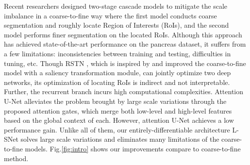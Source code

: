 \documentclass{article}
\begin{document}
Recent researchers designed two-stage cascade models \cite{zhou2017fixed,3dc2f} to mitigate the scale imbalance in a coarse-to-fine way where the first model conducts coarse segmentation and roughly locate Region of Interests (RoIs), and the second model performs finer segmentation on the located RoIs. Although this approach has achieved state-of-the-art performance on the pancreas dataset, it suffers from a few limitations: inconsistencies between training and testing, difficulties in tuning, etc. 
Though RSTN \cite{RSTN}, which is inspired by and improved the coarse-to-fine model with a saliency transformation module, can jointly optimize two deep networks, its optimization of locating RoIs is indirect and not interpretable. Further, the recurrent branch incurs high computational complexities. 
Attention U-Net \cite{attentionunet} alleviates the problem brought by large scale variations through the proposed attention gates, which merge both low-level and high-level features based on the global context of each. However, attention U-Net achieves a low performance gain. Unlike all of them, our entirely-differentiable architecture L-SNet solves large scale variations and eliminates many limitations of the coarse-to-fine models. Fig.\ref{fig:intro} shows our improvements compare to coarse-to-fine method. \par
\end{document}

